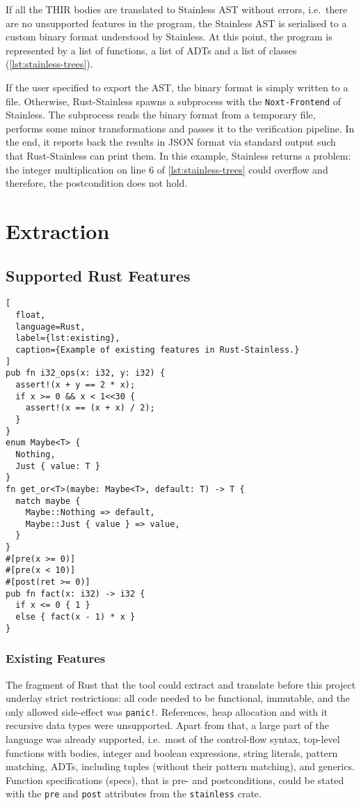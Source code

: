 If all the THIR bodies are translated to Stainless AST without errors,
i.e.~there are no unsupported features in the program, the Stainless AST is
serialised to a custom binary format understood by Stainless. At this point, the
program is represented by a list of functions, a list of ADTs and a list of
classes (\autoref{lst:stainless-trees}).

If the user specified to export the AST, the binary format is simply written to
a file. Otherwise, Rust-Stainless spawns a subprocess with the
\lstinline!Noxt-Frontend! of Stainless. The subprocess reads the binary format
from a temporary file, performs some minor transformations and passes it to the
verification pipeline. In the end, it reports back the results in JSON format
via standard output such that Rust-Stainless can print them. In this example,
Stainless returns a problem: the integer multiplication on line 6 of
\autoref{lst:stainless-trees} could overflow and therefore, the postcondition
does not hold.



\section{Extraction}

\subsection{Supported Rust Features}
\label{sec:supported-features}

\begin{lstlisting}[
  float,
  language=Rust,
  label={lst:existing},
  caption={Example of existing features in Rust-Stainless.}
]
pub fn i32_ops(x: i32, y: i32) {
  assert!(x + y == 2 * x);
  if x >= 0 && x < 1<<30 {
    assert!(x == (x + x) / 2);
  }
}
enum Maybe<T> {
  Nothing,
  Just { value: T }
}
fn get_or<T>(maybe: Maybe<T>, default: T) -> T {
  match maybe {
    Maybe::Nothing => default,
    Maybe::Just { value } => value,
  }
}
#[pre(x >= 0)]
#[pre(x < 10)]
#[post(ret >= 0)]
pub fn fact(x: i32) -> i32 {
  if x <= 0 { 1 }
  else { fact(x - 1) * x }
}
\end{lstlisting}

\subsubsection{Existing Features}

The fragment of Rust that the tool could extract and translate before this
project underlay strict restrictions: all code needed to be functional,
immutable, and the only allowed side-effect was \lstinline"panic!". References,
heap allocation and with it recursive data types were unsupported. Apart from
that, a large part of the language was already supported, i.e.~most of the
control-flow syntax, top-level functions with bodies, integer and boolean
expressions, string literals, pattern matching, ADTs, including tuples (without
their pattern matching), and generics. Function specifications (specs), that is
pre- and postconditions, could be stated with the \lstinline!pre! and
\lstinline!post! attributes from the \lstinline!stainless! crate.

